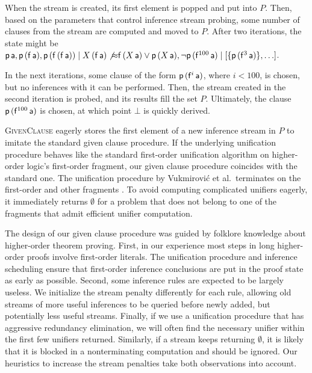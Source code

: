 \documentclass[smallcondensed,draft]{svjour3}     %
\begin{document}
\begin{exa}
  When the stream is created, its first element is popped and put into $P$. Then, based on the
  parameters that control inference stream probing, some number of clauses from
  the stream are computed and moved to $P$. After two iterations, the state might be
  $ {\mathsf{p}} \,
  {\mathsf{a}}, {\mathsf{p}} \, ({\mathsf{f}} \, {\mathsf{a}}), {\mathsf{p}} \, ({\mathsf{f}} \, ({\mathsf{f}} \, {\mathsf{a}}))   \mid X \,
  ({\mathsf{f}} \, {\mathsf{a}}) \not\mathbin{\approx} {\mathsf{f}} \, (X \, {\mathsf{a}}) \lor {\mathsf{p}} \, (X \,
  {\mathsf{a}}), \neg {\mathsf{p}} \, ({\mathsf{f}}^{100} \, {\mathsf{a}}) \mid [ \{{\mathsf{p}} \, ({\mathsf{f}}^3\,{\mathsf{a}})\}, \ldots ]$. 
  
  In the next iterations, some clause of the form ${\mathsf{p}} \, ({\mathsf{f}}^{i} \,
  {\mathsf{a}})$, where $i < 100$, is chosen, but no inferences with it can be
  performed. Then, the stream created in the second iteration is probed, and its
  results fill the set $P$. Ultimately, the clause ${\mathsf{p}} \, ({\mathsf{f}}^{100} \,
  {\mathsf{a}})$ is chosen, at which point $\bot$ is quickly derived.
\end{exa}

\textsc{GivenClause} eagerly stores the first element of a new inference stream
in $P$ to imitate the standard given clause procedure. If the underlying
unification procedure behaves like the standard first-order unification
algorithm on higher-order logic's first-order fragment, our given clause
procedure coincides with the standard one. The unification procedure by
Vukmirović et al.\ terminates on the first-order and other fragments
\cite{tn-93-patterns}. To avoid computing
complicated unifiers eagerly, it immediately returns $\emptyset$ for a problem that does not
belong to one of the fragments that admit efficient unifier computation.


The design of our given clause procedure was guided by folklore knowledge about
higher-order theorem proving. First, in our experience most steps in
long higher-order proofs involve first-order literals. The unification
procedure and inference scheduling ensure that first-order inference
conclusions are put in the proof state as early as possible. Second, some
inference rules are expected to be largely useless. We initialize the stream
penalty differently for each rule, allowing old streams of more useful
inferences to be queried before newly added, but potentially less useful
streams. Finally, if we use a unification procedure that has aggressive
redundancy elimination, we will often find the necessary unifier within the
first few unifiers returned. Similarly, if a stream keeps returning
$\emptyset$, it is likely that it is blocked in a nonterminating computation
and should be ignored. Our heuristics to increase the stream penalties take
both observations into account.
\end{document}
